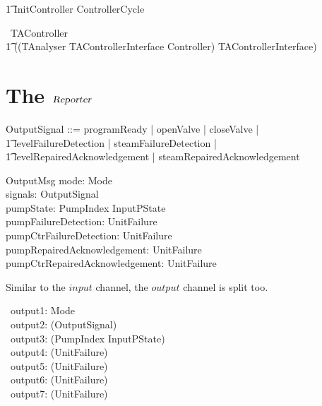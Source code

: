 \documentclass{report} %
\begin{document}
\begin{circus}
        \t1 \circspot \lschexpract InitController \rschexpract \circseq ControllerCycle \\

    \circend
\end{circus}

\begin{circus}
   \circprocess\ TAController \circdef \\
    \t1 ((TAnalyser \lpar TAControllerInterface \rpar Controller) \circhide TAControllerInterface)
\end{circus}
\chapter{The $\mathsl{Reporter}$}

\begin{zed}
  OutputSignal ::= programReady  | openValve | closeValve | \\
      \t1 levelFailureDetection | steamFailureDetection | \\
      \t1 levelRepairedAcknowledgement | steamRepairedAcknowledgement
\end{zed}

\begin{schema}{OutputMsg}
  mode: Mode
  \\ %
  signals: \power OutputSignal
  \\ %
  pumpState: PumpIndex \fun InputPState
  \\ %
  pumpFailureDetection: \power UnitFailure
  \\ %
  pumpCtrFailureDetection: \power UnitFailure
  \\ %
  pumpRepairedAcknowledgement: \power UnitFailure
  \\ %
  pumpCtrRepairedAcknowledgement: \power UnitFailure
\end{schema}

Similar to the $input$ channel, the $output$ channel is split too.
\begin{circus}

  \circchannel\ output1: Mode \\ %
  \circchannel\ output2: (\power OutputSignal) \\ %
  \circchannel\ output3: (PumpIndex \fun InputPState) \\ %
  \circchannel\ output4: (\power UnitFailure) \\ %
  \circchannel\ output5: (\power UnitFailure) \\ %
  \circchannel\ output6: (\power UnitFailure) \\ %
  \circchannel\ output7: (\power UnitFailure) %
                    \\
\end{circus}
\end{document}
